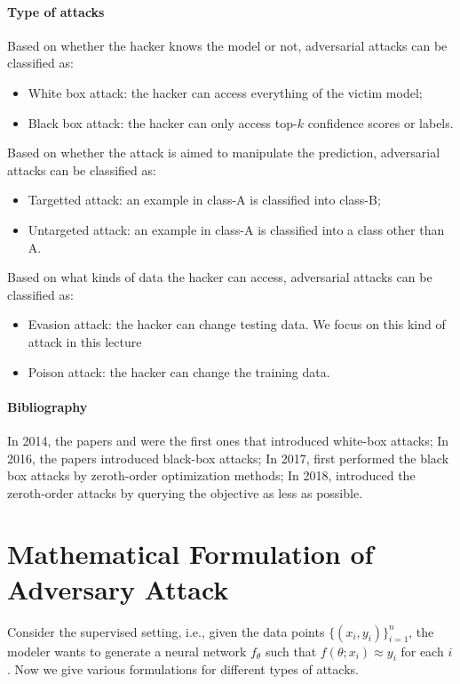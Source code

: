 \paragraph{Type of attacks}
Based on whether the hacker knows the model or not,
adversarial attacks can be classified as:
\begin{itemize}
\item
White box attack: the hacker can access everything of the victim model;
\item
Black box attack: the hacker can only access top-$k$ confidence scores or labels.
\end{itemize}
Based on whether the attack is aimed to manipulate the prediction, adversarial attacks can be classified as:
\begin{itemize}
\item
Targetted attack: an example in class-A is classified into class-B;
\item
Untargeted attack: an example in class-A is classified into a class other than A.
\end{itemize}
Based on what kinds of data the hacker can access, 
adversarial attacks can be classified as:
\begin{itemize}
\item
Evasion attack: the hacker can change  testing data.
We focus on this kind of attack in this lecture
\item
Poison attack: the hacker can change the training data.
\end{itemize}

\paragraph{Bibliography}
In 2014, the papers \citep{43405} and \citep{42503} were the first ones that introduced white-box attacks;
In 2016, the papers \citep{7958570} introduced black-box attacks;
In 2017, \citep{Chen2017} first performed the black box attacks by zeroth-order optimization methods;
In 2018, \citep{Ilyas2018} introduced the zeroth-order attacks by querying the objective as less as possible.

\section{Mathematical Formulation of Adversary Attack}
Consider the supervised setting, i.e., given the data points $\{(x_i,y_i)\}_{i=1}^n$, the modeler wants to generate a neural network $f_{\theta}$ such that $f(\theta;x_i)\approx y_i$ for each $i$.
Now we give various formulations for different types of attacks.


